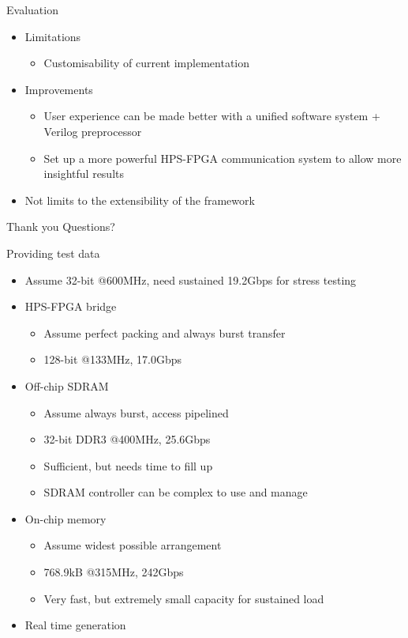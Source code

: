 \documentclass[t]{beamer}
\begin{document}
\begin{frame}{Evaluation}
\begin{itemize}
  \item<+-> Limitations
  \begin{itemize}
    \item Customisability of current implementation
  \end{itemize}
  \item<+-> Improvements
  \begin{itemize}
    \item User experience can be made better with a unified software system + Verilog preprocessor
    \item Set up a more powerful HPS-FPGA communication system to allow more insightful results \newline
  \end{itemize}
  \item<+-> Not limits to the extensibility of the framework
\end{itemize}
\end{frame}

\begin{frame}{Thank you}
  Questions?
\end{frame}


\begin{frame}{Providing test data}
  \begin{itemize}
    \item Assume 32-bit @600MHz, need sustained 19.2Gbps for stress testing
    \item HPS-FPGA bridge
    \begin{itemize}
      \item Assume perfect packing and always burst transfer
      \item 128-bit @133MHz, 17.0Gbps
    \end{itemize}
    \item Off-chip SDRAM
    \begin{itemize}
      \item Assume always burst, access pipelined
      \item 32-bit DDR3 @400MHz, 25.6Gbps
      \item Sufficient, but needs time to fill up
      \item SDRAM controller can be complex to use and manage
    \end{itemize}
    \item On-chip memory
    \begin{itemize}
      \item Assume widest possible arrangement
      \item 768.9kB @315MHz, 242Gbps
      \item Very fast, but extremely small capacity for sustained load
    \end{itemize}
    \item Real time generation
  \end{itemize}
\end{frame}
\end{document}
